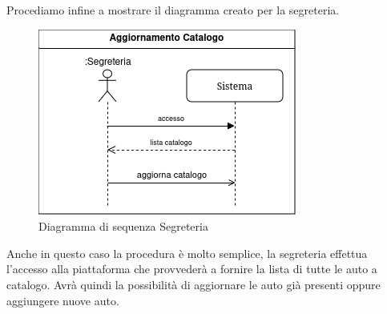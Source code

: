 \documentclass[a4paper, 11pt,oneside]{book}
\newcommand{\spacing}{\par\bigskip\noindent}
\begin{document}
        \spacing
        Procediamo infine a mostrare il diagramma creato per la segreteria.
        \begin{figure}[H]
            \centering
            \includegraphics[scale=0.75]{sequence_diagram_catalog.png}
            \caption{Diagramma di sequenza Segreteria}
            \label{fig:diagramma_sequenza_segreteria}
        \end{figure}
        \spacing
        Anche in questo caso la procedura è molto semplice, la segreteria effettua l'accesso alla piattaforma che provvederà a fornire la lista di tutte le auto a catalogo. Avrà quindi la possibilità di aggiornare le auto
        già presenti oppure aggiungere nuove auto.
\end{document}
